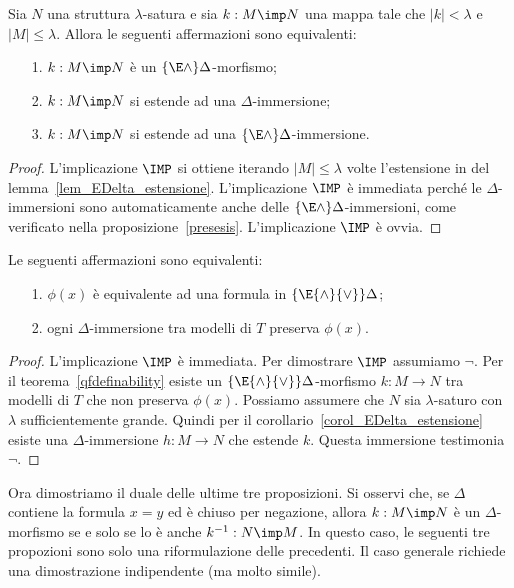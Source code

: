\begin{corollary}\label{corol_EDelta_estensione}
Sia $N$ una struttura $\lambda$-satura e sia $k:M\imp N$ una mappa tale che $|k|<\lambda$ e $|M|\le\lambda$. Allora le seguenti affermazioni sono equivalenti:
\begin{itemize}
\item[1.] $k:M\imp N$ \`e un $\{\E\wedge\}\Delta$-morfismo;
\item[2.] $k:M\imp N$ si estende ad una $\Delta$-immersione;
\item[3.] $k:M\imp N$ si estende ad una $\{\E\wedge\}\Delta$-immersione.
\end{itemize}
\end{corollary}
\begin{proof}
L'implicazione $\IMP$ si ottiene iterando $|M|\le\lambda$ volte l'estensione in  del lemma~\ref{lem_EDelta_estensione}. L'implicazione $\IMP$ \`e immediata perch\'e le $\Delta$-immersioni sono automaticamente anche delle $\{\E\wedge\}\Delta$-immersioni, come verificato nella proposizione~\ref{presesis}. L'implicazione $\IMP$ \`e ovvia.
\end{proof}


\begin{theorem}
Le seguenti affermazioni sono equivalenti:
\begin{itemize}
\item[1.] $\phi(x)$ \`e equivalente ad una formula in $\{\E{\wedge}{\vee}\}\Delta$;
\item[2.] ogni $\Delta$-immersione tra modelli di $T$ preserva $\phi(x)$.
\end{itemize}
\end{theorem}
\begin{proof}
L'implicazione $\IMP$ \`e immediata. Per dimostrare  $\IMP$ assumiamo $\neg$. Per il teorema~\ref{qfdefinability} esiste un $\{\E{\wedge}{\vee}\}\Delta$-morfismo $k:M\to N$ tra modelli di $T$ che non preserva $\phi(x)$. Possiamo assumere che $N$ sia $\lambda$-saturo con $\lambda$ sufficientemente grande. Quindi per il corollario~\ref{corol_EDelta_estensione} esiste una $\Delta$-immersione $h:M\to N$ che estende $k$. Questa immersione testimonia $\neg$.
\end{proof}

Ora dimostriamo il duale delle ultime tre proposizioni. Si osservi che, se $\Delta$ contiene la formula $x=y$ ed \`e chiuso per negazione, allora  $k:M\imp N$ \`e un $\Delta$-morfismo se e solo se lo \`e anche $k^{-1}:N\imp M$. In questo caso, le seguenti tre propozioni sono solo una riformulazione delle precedenti.  Il caso generale richiede una dimostrazione indipendente (ma molto simile).

